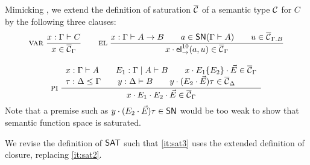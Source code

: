 Mimicking ,
we extend the definition of saturation $\overline{\mathcal{C}}$ of a semantic type $\mathcal{C}$
for $C$ by the following three clauses:
\begin{gather*}
  \mbox{\textsc{var}}\;\dfrac{x : \Gamma \vdash C}{x \in \overline{\mathcal{C}}_\Gamma}
\qquad
  \mbox{\textsc{el}}
    \;\dfrac{x : \Gamma \vdash A \to B \qquad
      a \in \mathsf{SN}(\Gamma \vdash A) \qquad
      u \in \overline{\mathcal{C}}_{\Gamma.B}
    }{x \cdot \mathsf{el}_{\to}^{10}(a,u) \in \overline{\mathcal{C}}_\Gamma}
\\[2ex]
  \mbox{\textsc{pi}}
    \;\dfrac{\begin{array}{l}x : \Gamma \vdash A \qquad
      E_1 : \Gamma \mid A \vdash B \qquad
      x \cdot E_1\{E_2\} \cdot \vec E \in \overline{\mathcal{C}}_\Gamma \\
      \tau : \Delta \leq \Gamma \qquad
      y : \Delta \vdash B \qquad
      y \cdot (E_2 \cdot \vec E)\tau \in \overline{\mathcal{C}}_{\Delta}
    \end{array}}{x \cdot E_1 \cdot E_2 \cdot \vec E \in \overline{\mathcal{C}}_\Gamma}
\end{gather*}
Note that a premise such as $y \cdot (E_2 \cdot \vec E)\tau \in \mathsf{SN}$ would
be too weak to show that semantic function space is saturated.

We revise the definition of $\mathsf{SAT}$ such that \ref{it:sat3} uses the
extended definition of closure, replacing \ref{it:sat2}.


